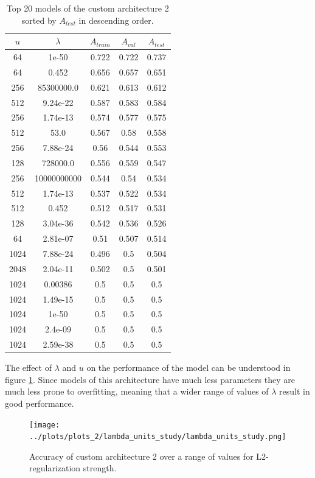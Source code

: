 \begin{table}[ht]
\centering
\begin{tabular}{ |c|c|c|c|c| }
\hline
$u$ & $\lambda$ & $A_{train}$ & $A_{val}$ & $A_{test}$ \\
\hline
64 & 1e-50 & 0.722 & 0.722 & 0.737 \\
64 & 0.452 & 0.656 & 0.657 & 0.651 \\
256 & 85300000.0 & 0.621 & 0.613 & 0.612 \\
512 & 9.24e-22 & 0.587 & 0.583 & 0.584 \\
256 & 1.74e-13 & 0.574 & 0.577 & 0.575 \\
512 & 53.0 & 0.567 & 0.58 & 0.558 \\
256 & 7.88e-24 & 0.56 & 0.544 & 0.553 \\
128 & 728000.0 & 0.556 & 0.559 & 0.547 \\
256 & 10000000000 & 0.544 & 0.54 & 0.534 \\
512 & 1.74e-13 & 0.537 & 0.522 & 0.534 \\
512 & 0.452 & 0.512 & 0.517 & 0.531 \\
128 & 3.04e-36 & 0.542 & 0.536 & 0.526 \\
64 & 2.81e-07 & 0.51 & 0.507 & 0.514 \\
1024 & 7.88e-24 & 0.496 & 0.5 & 0.504 \\
2048 & 2.04e-11 & 0.502 & 0.5 & 0.501 \\
1024 & 0.00386 & 0.5 & 0.5 & 0.5 \\
1024 & 1.49e-15 & 0.5 & 0.5 & 0.5 \\
1024 & 1e-50 & 0.5 & 0.5 & 0.5 \\
1024 & 2.4e-09 & 0.5 & 0.5 & 0.5 \\
1024 & 2.59e-38 & 0.5 & 0.5 & 0.5 \\
\hline
\end{tabular}
\caption{Top 20 models of the custom architecture 2 sorted by $A_{test}$ in descending order.}
\label{table:top20_custom2}
\end{table}


The effect of $\lambda$ and $u$ on the performance of the model can be understood in figure \ref{fig:lambda_units_study_custom2}. Since models of this architecture have much less parameters they are much less prone to overfitting, meaning that a wider range of values of $\lambda$ result in good performance.

\begin{figure}[ht]
    \centering
    \texttt{[image: ../plots/plots\_2/lambda\_units\_study/lambda\_units\_study.png]}
    \caption{Accuracy of custom architecture 2 over a range of values for L2-regularization strength.}
    \label{fig:lambda_units_study_custom2}
\end{figure}

